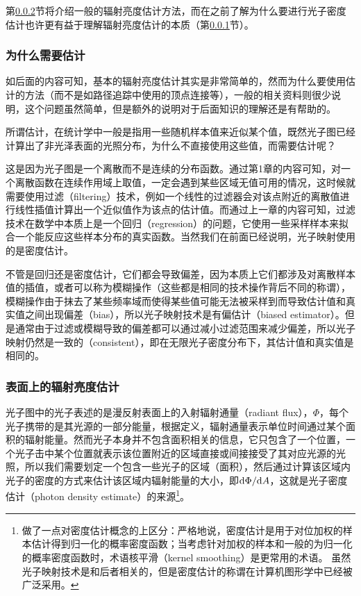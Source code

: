 第\ref{sec:pm-radiance-estimate-at-a-surface}节将介绍一般的辐射亮度估计方法，而在之前了解为什么要进行光子密度估计也许更有益于理解辐射亮度估计的本质（第\ref{sec:pm-why-radiance-estimate}节）。




\subsubsection{为什么需要估计}\label{sec:pm-why-radiance-estimate}
如后面的内容可知，基本的辐射亮度估计其实是非常简单的，然而为什么要使用估计的方法（而不是如路径追踪中使用的顶点连接等），一般的相关资料则很少说明，这个问题虽然简单，但是额外的说明对于后面知识的理解还是有帮助的。

所谓估计，在统计学中一般是指用一些随机样本值来近似某个值，既然光子图已经计算出了非光泽表面的光照分布，为什么不直接使用这些值，而需要估计呢？

这是因为光子图是一个离散而不是连续的分布函数。通过第1章的内容可知，对一个离散函数在连续作用域上取值，一定会遇到某些区域无值可用的情况，这时候就需要使用过滤（filtering）技术，例如一个线性的过滤器会对该点附近的离散值进行线性插值计算出一个近似值作为该点的估计值。而通过上一章的内容可知，过滤技术在数学中本质上是一个回归（regression）的问题，它使用一些采样样本来拟合一个能反应这些样本分布的真实函数。当然我们在前面已经说明，光子映射使用的是密度估计。

不管是回归还是密度估计，它们都会导致偏差，因为本质上它们都涉及对离散样本值的插值，或者可以称为模糊操作（这些都是相同的技术操作背后不同的称谓），模糊操作由于抹去了某些频率域而使得某些值可能无法被采样到而导致估计值和真实值之间出现偏差（bias），所以光子映射技术是有偏估计（biased estimator）。但是通常由于过滤或模糊导致的偏差都可以通过减小过滤范围来减少偏差，所以光子映射仍然是一致的（consistent），即在无限光子密度分布下，其估计值和真实值是相同的。





\subsubsection{表面上的辐射亮度估计}\label{sec:pm-radiance-estimate-at-a-surface}
光子图中的光子表述的是漫反射表面上的入射辐射通量（radiant flux），$\Phi$，每个光子携带的是其光源的一部分能量，根据定义，辐射通量表示单位时间通过某个面积的辐射能量。然而光子本身并不包含面积相关的信息，它只包含了一个位置，一个光子击中某个位置就表示该位置附近的区域直接或间接接受了其对应光源的光照，所以我们需要划定一个包含一些光子的区域（面积），然后通过计算该区域内光子的密度的方式来估计该区域内辐射能量的大小，即${\rm d}\Phi /{\rm d}A$，这就是光子密度估计（photon density estimate）的来源\footnote{\cite{b:pbrt}做了一点对密度估计概念的上区分：严格地说，密度估计是用于对位加权的样本估计得到归一化的概率密度函数；当考虑针对加权的样本和一般的为归一化的概率密度函数时，术语核平滑（kernel smoothing）是更常用的术语。 虽然光子映射技术是和后者相关的，但是密度估计的称谓在计算机图形学中已经被广泛采用。}。

